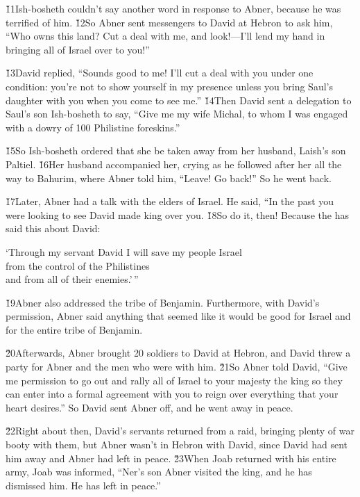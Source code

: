 \v{11}Ish-bosheth couldn't say another word in response to Abner, because he was terrified of him. \v{12}So Abner sent messengers to David at Hebron to ask him, ``Who owns this land? Cut a deal with me, and look!---I'll lend my hand in bringing all of Israel over to you!''

\v{13}David replied, ``Sounds good to me! I'll cut a deal with you under one condition: you're not to show yourself in my presence unless you bring Saul's daughter with you when you come to see me.'' \v{14}Then David sent a delegation to Saul's son Ish-bosheth to say, ``Give me my wife Michal, to whom I was engaged with a dowry of 100 Philistine foreskins.''

\v{15}So Ish-bosheth ordered that she be taken away from her husband, Laish's son Paltiel. \v{16}Her husband accompanied her, crying as he followed after her all the way to Bahurim, where Abner told him, ``Leave! Go back!'' So he went back.

\v{17}Later, Abner had a talk with the elders of Israel. He said, ``In the past you were looking to see David made king over you. \v{18}So do it, then! Because the  has said this about David:

\begin{poetry}
\poeml `Through my servant David I will save my people Israel \\
\poemll    from the control of the Philistines \\
\poemlll       and from all of their enemies.'\,''
\end{poetry}

\v{19}Abner also addressed the tribe of Benjamin. Furthermore, with David's permission, Abner said anything that seemed like it would be good for Israel and for the entire tribe of Benjamin.

\v{20}Afterwards, Abner brought 20 soldiers to David at Hebron, and David threw a party for Abner and the men who were with him. \v{21}So Abner told David, ``Give me permission to go out and rally all of Israel to your majesty the king so they can enter into a formal agreement with you to reign over everything that your heart desires.'' So David sent Abner off, and he went away in peace.

\v{22}Right about then, David's servants returned from a raid, bringing plenty of war booty with them, but Abner wasn't in Hebron with David, since David had sent him away and Abner had left in peace. \v{23}When Joab returned with his entire army, Joab was informed, ``Ner's son Abner visited the king, and he has dismissed him. He has left in peace.''

